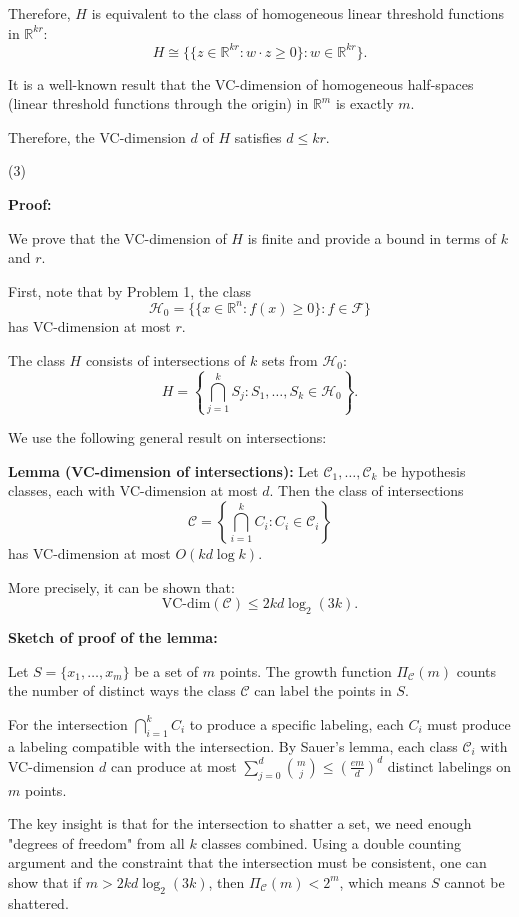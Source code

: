 \documentclass[letterpaper, 11pt]{article}
\newcommand{\1}{\mathds{1}}	%
\theoremstyle{definition}
\begin{document}
Therefore, $H$ is equivalent to the class of homogeneous linear threshold functions in $\mathbb{R}^{kr}$:
\[
H \cong \{\{z \in \mathbb{R}^{kr} : w \cdot z \geq 0\} : w \in \mathbb{R}^{kr}\}.
\]

It is a well-known result that the VC-dimension of homogeneous half-spaces (linear threshold functions through the origin) in $\mathbb{R}^m$ is exactly $m$.

Therefore, the VC-dimension $d$ of $H$ satisfies $d \leq kr$.


(3)

\textbf{Proof:}

We prove that the VC-dimension of $H$ is finite and provide a bound in terms of $k$ and $r$.

First, note that by Problem 1, the class
\[
\mathcal{H}_0 = \{\{x \in \mathbb{R}^n : f(x) \geq 0\} : f \in \mathcal{F}\}
\]
has VC-dimension at most $r$.

The class $H$ consists of intersections of $k$ sets from $\mathcal{H}_0$:
\[
H = \left\{\bigcap_{j=1}^k S_j : S_1, \ldots, S_k \in \mathcal{H}_0\right\}.
\]

We use the following general result on intersections:

\textbf{Lemma (VC-dimension of intersections):} Let $\mathcal{C}_1, \ldots, \mathcal{C}_k$ be hypothesis classes, each with VC-dimension at most $d$. Then the class of intersections
\[
\mathcal{C} = \left\{\bigcap_{i=1}^k C_i : C_i \in \mathcal{C}_i\right\}
\]
has VC-dimension at most $O(kd \log k)$.

More precisely, it can be shown that:
\[
\text{VC-dim}(\mathcal{C}) \leq 2kd \log_2(3k).
\]

\textbf{Sketch of proof of the lemma:}

Let $S = \{x_1, \ldots, x_m\}$ be a set of $m$ points. The growth function $\Pi_{\mathcal{C}}(m)$ counts the number of distinct ways the class $\mathcal{C}$ can label the points in $S$.

For the intersection $\bigcap_{i=1}^k C_i$ to produce a specific labeling, each $C_i$ must produce a labeling compatible with the intersection. By Sauer's lemma, each class $\mathcal{C}_i$ with VC-dimension $d$ can produce at most $\sum_{j=0}^d \binom{m}{j} \leq \left(\frac{em}{d}\right)^d$ distinct labelings on $m$ points.

The key insight is that for the intersection to shatter a set, we need enough "degrees of freedom" from all $k$ classes combined. Using a double counting argument and the constraint that the intersection must be consistent, one can show that if $m > 2kd\log_2(3k)$, then $\Pi_{\mathcal{C}}(m) < 2^m$, which means $S$ cannot be shattered.
\end{document}
